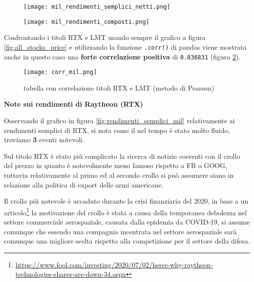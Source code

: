 \begin{figure}[h]
  \centering
  \begin{minipage}{.5\textwidth}
    \centering
    \texttt{[image: mil\_rendimenti\_semplici\_netti.png]}
    \label{fig:rendimenti_semplici_mil}
  \end{minipage}%
  \begin{minipage}{.5\textwidth}
    \centering
    \texttt{[image: mil\_rendimenti\_composti.png]}
    \label{fig:rendimenti_compositi_mil}
  \end{minipage}
\end{figure}

Confrontando i titoli RTX e LMT usando sempre il grafico a figura \ref{fig:all_stocks_price} e utilizzando la funzione \verb|.corr()| di pandas
viene mostrata anche in questo caso una \textbf{forte correlazione positiva} di \verb|0.836831| (figura \ref{fig:corr_mill}).

\begin{figure}[h]
  \centering
  \texttt{[image: corr\_mil.png]}
  \caption{tabella con correlazione titoli RTX e LMT (metodo di Pearson)}
  \label{fig:corr_mill}
\end{figure}

\textbf{Note sui rendimenti di Raytheon (RTX)}

Osservando il grafico in figura \ref{fig:rendimenti_semplici_mil} relativamente ai rendimenti semplici di RTX, si nota come il nel tempo è
stato molto fluido, troviamo \textbf{3} eventi notevoli.

Sul titolo RTX è stato più complicato la ricerca di notizie coerenti con il crollo del prezzo in quanto è notevolmente meno famoso rispetto a FB o GOOG,
tuttavia relativamente al primo ed al secondo crollo si può assumere siano in relazione alla politica di export delle armi americane.

Il crollo più notevole è accaduto durante la crisi finanziaria del 2020, in base a un 
articolo\footnote{
  \href{https://www.fool.com/investing/2020/07/02/heres-why-raytheon-technologies-shares-are-down-34.aspx}{https://www.fool.com/investing/2020/07/02/heres-why-raytheon-technologies-shares-are-down-34.aspx}
}
la motivazione del crollo è stata a causa della temporanea debolezza nel settore commerciale aerospaziale, causata dalla epidemia da COVID-19,
si assume comunque che essendo una compagnia incentrata nel settore aerospaziale sarà comunque una migliore scelta rispetto alla competizione per il
settore della difesa.\\


